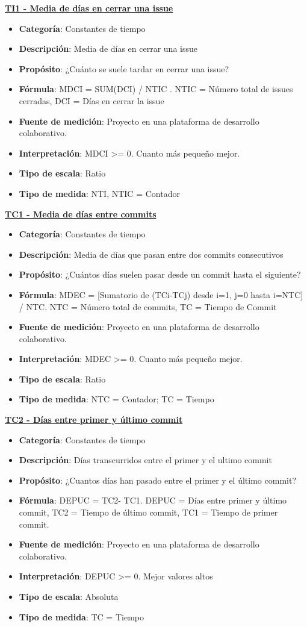 \textbf{\underline{TI1 - Media de días en cerrar una issue}}
\begin{itemize}
	\tightlist
	\item \textbf{Categoría}: Constantes de tiempo
	\item \textbf{Descripción}:  Media de días en cerrar una issue
	\item \textbf{Propósito}: ¿Cuánto se suele tardar en cerrar una issue? 
	\item \textbf{Fórmula}: MDCI = SUM(DCI) / NTIC . NTIC = Número total de issues cerradas, DCI = Días en cerrar la issue
	\item \textbf{Fuente de medición}: Proyecto en una plataforma de desarrollo colaborativo.
	\item \textbf{Interpretación}: MDCI >= 0. Cuanto más pequeño mejor.
	\item \textbf{Tipo de escala}: Ratio
	\item \textbf{Tipo de medida}: NTI, NTIC = Contador
\end{itemize}
\textbf{\underline{TC1 - Media de días entre commits}}
\begin{itemize}
	\tightlist
	\item \textbf{Categoría}: Constantes de tiempo
	\item \textbf{Descripción}: Media de días que pasan entre dos commits consecutivos
	\item \textbf{Propósito}: ¿Cuántos días suelen pasar desde un commit hasta el siguiente?
	\item \textbf{Fórmula}: MDEC = [Sumatorio de (TCi-TCj) desde i=1, j=0 hasta i=NTC] / NTC. NTC = Número total de commits, TC = Tiempo de Commit 
	\item \textbf{Fuente de medición}: Proyecto en una plataforma de desarrollo colaborativo.
	\item \textbf{Interpretación}: MDEC >= 0. Cuanto más pequeño mejor.
	\item \textbf{Tipo de escala}: Ratio
	\item \textbf{Tipo de medida}: NTC = Contador; TC = Tiempo
\end{itemize}
\textbf{\underline{TC2 - Días entre primer y último commit}}
\begin{itemize}
	\tightlist
	\item \textbf{Categoría}: Constantes de tiempo
	\item \textbf{Descripción}: Días transcurridos entre el primer y el ultimo commit 
	\item \textbf{Propósito}: ¿Cuantos días han pasado entre el primer y el último commit?
	\item \textbf{Fórmula}: DEPUC = TC2- TC1. DEPUC = Días entre primer y último commit, TC2 = Tiempo de último commit, TC1 = Tiempo de primer commit.
	\item \textbf{Fuente de medición}: Proyecto en una plataforma de desarrollo colaborativo.
	\item \textbf{Interpretación}: DEPUC >= 0. Mejor valores altos
	\item \textbf{Tipo de escala}: Absoluta
	\item \textbf{Tipo de medida}: TC = Tiempo
\end{itemize}
